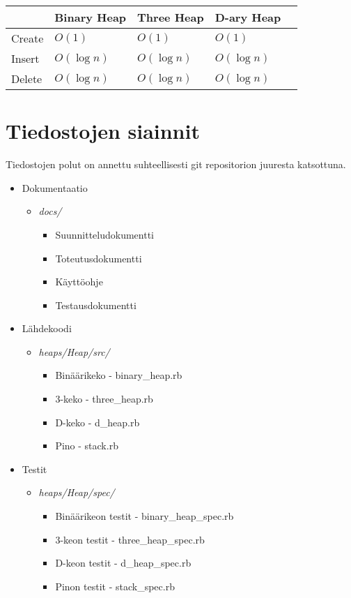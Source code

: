 \documentclass[a4paper,12pt]{article}
\begin{document}
\begin{tabular}{|l|l|l|l|l|}
\hline
&Binary Heap & Three Heap & D-ary Heap \\\hline
Create & $O (1)$ & $O (1)$ & $O (1)$\\\hline
Insert & $O (\log n)$ & $O (\log n)$ & $O (\log n)$\\\hline
Delete  & $O (\log n)$ & $O (\log n)$ & $O (\log n)$\\\hline

\end{tabular}

\section{Tiedostojen siainnit}
Tiedostojen polut on annettu suhteellisesti git repositorion juuresta katsottuna.
\begin{itemize}
\item Dokumentaatio
\begin{itemize}
\item \emph{docs/} 
\begin{itemize}
\item Suunnitteludokumentti
\item Toteutusdokumentti
\item Käyttöohje
\item Testausdokumentti
\end{itemize}
\end{itemize}

\item Lähdekoodi
\begin{itemize}
\item \emph{heaps/Heap/src/} 
\begin{itemize}
\item Binäärikeko - binary\_heap.rb
\item 3-keko - three\_heap.rb
\item D-keko - d\_heap.rb
\item Pino - stack.rb
\end{itemize}
\end{itemize}

\item Testit
\begin{itemize}
\item \emph{heaps/Heap/spec/} 
\begin{itemize}
\item Binäärikeon testit - binary\_heap\_spec.rb
\item 3-keon testit - three\_heap\_spec.rb
\item D-keon testit - d\_heap\_spec.rb
\item Pinon testit - stack\_spec.rb
\end{itemize}
\end{itemize}


\end{itemize}
\end{document}
